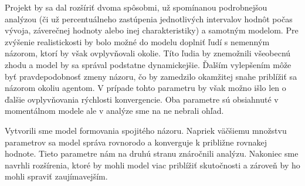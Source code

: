 \documentclass[10pt,a4paper]{report}
\begin{document}
Projekt by sa dal rozšíriť dvoma spôsobmi, už spomínanou podrobnejšou analýzou (či už percentuálneho zastúpenia jednotlivých intervalov hodnôt počas vývoja, záverečnej hodnoty alebo inej charakteristiky) a samotným modelom. Pre zvýšenie realistickosti by bolo možné do modelu doplniť ľudí s nemenným názorom, ktorí by však ovplyvňovali okolie. Títo ľudia by znemožnili všeobecnú zhodu a model by sa správal podstatne dynamickejšie. Ďalším vylepšením môže byť pravdepodobnosť zmeny názoru, čo by zamedzilo okamžitej snahe priblížiť sa názorom okoliu agentom. V prípade tohto parametru by však možno išlo len o ďalšie ovplyvňovania rýchlosti konvergencie. Oba parametre sú obsiahnuté v momentálnom modele ale v analýze sme na ne nebrali ohľad.

Vytvorili sme model formovania spojitého názoru. Napriek väčšiemu množstvu parametrov sa model správa rovnorodo a konverguje k približne rovnakej hodnote. Tieto parametre nám na druhú stranu znáročnili analýzu. Nakoniec sme navrhli rozšírenia, ktoré by mohli model viac priblížiť skutočnosti a zároveň by ho mohli spraviť zaujímavejším.
\end{document}
